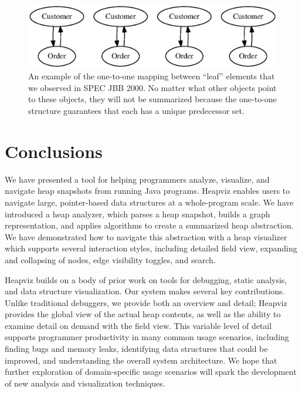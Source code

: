 \begin{figure}[t]
  \includegraphics[width=\columnwidth]{figs/failure}
  \caption{An example of the one-to-one mapping between ``leaf'' elements
that we observed in SPEC JBB 2000.  No matter what other objects point to
these objects, they will not be summarized because the one-to-one structure
guarantees that each has a unique predecessor set.}
  \label{fig:failure}
\end{figure}


\section{Conclusions}
\label{conclusions}

We have presented a tool for helping programmers analyze, visualize,
and navigate heap snapshots from running Java programs.  Heapviz enables users
to navigate large, pointer-based data structures at a whole-program scale.  We
have introduced a heap analyzer, which parses a heap snapshot, builds a graph
representation, and applies algorithms to create a summarized heap abstraction.
We have demonstrated how to navigate this abstraction with a heap visualizer
which supports several interaction styles, including detailed field view,
expanding and collapsing of nodes, edge visibility toggles, and search.

Heapviz builds on a body of prior work on tools for debugging, static analysis,
and data structure visualization.  Our system makes several key contributions.
Unlike traditional debuggers, we provide both an overview and detail; Heapviz
provides the global view of the actual heap contents, as well as the ability to
examine detail on demand with the field view.  
This variable level of detail supports programmer productivity in many common
usage scenarios, including finding bugs and memory leaks, identifying data
structures that could be improved, and understanding the overall system
architecture.  We hope that further exploration of domain-specific usage
scenarios will spark the development of new analysis and visualization
techniques.
